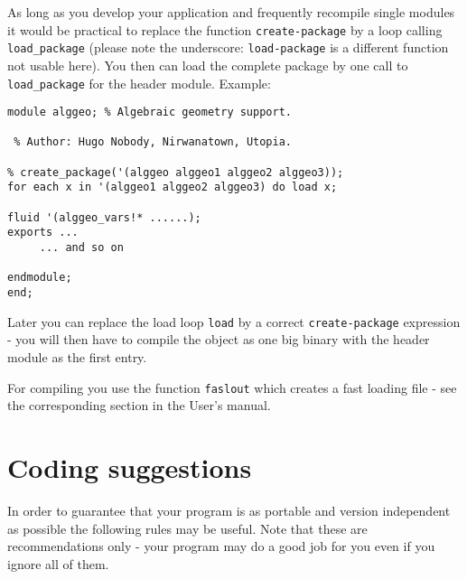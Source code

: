 \documentclass[11pt]{article}
\begin{document}
As long as you develop your
application and frequently recompile single modules
it would be practical to replace the function
{\tt create-package} by a loop calling {\tt load\_package} (please
note the underscore: {\tt load-package} is a different 
function not usable here). You then can load the complete package
by one call to {\tt load\_package} for the header
module. Example:

\begin{verbatim}
module alggeo; % Algebraic geometry support.

 % Author: Hugo Nobody, Nirwanatown, Utopia.

% create_package('(alggeo alggeo1 alggeo2 alggeo3));
for each x in '(alggeo1 alggeo2 alggeo3) do load x;

fluid '(alggeo_vars!* ......);
exports ...
     ... and so on

endmodule;
end;
\end{verbatim}
Later you can replace the load loop {\tt load} by a correct 
{\tt create-package} expression - you will then have to compile the 
object as one big binary with the header module as the first
entry.

For compiling you use the function {\tt faslout} which creates
a fast loading file - see the corresponding section in the User's
manual.
\section{Coding suggestions}

In order to guarantee that your program is as portable
and version independent as possible 
the following rules may be useful. Note that these are recommendations
only - your program may do a good job for you even if
you ignore all of them.
\end{document}
